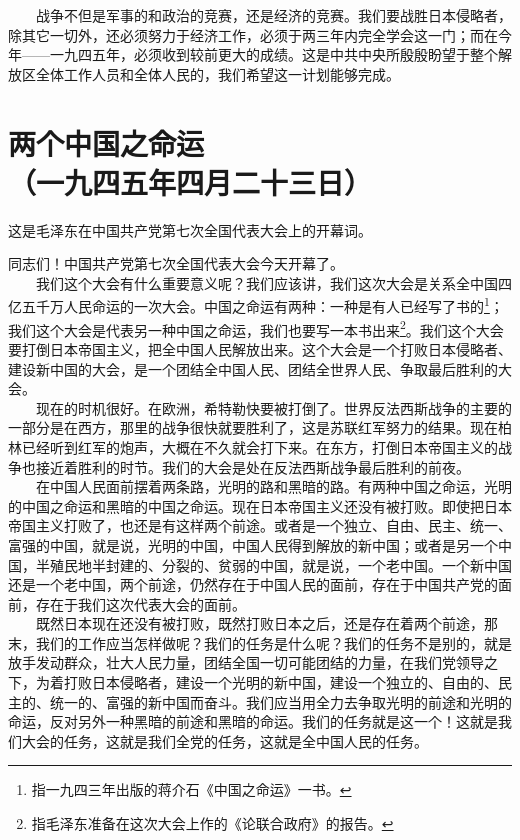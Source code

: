 \documentclass[cn,11pt,chinese]{elegantbook}
\def\myformat#1{\hfil\hfil #1}
\begin{document}
　　战争不但是军事的和政治的竞赛，还是经济的竞赛。我们要战胜日本侵略者，除其它一切外，还必须努力于经济工作，必须于两三年内完全学会这一门；而在今年——一九四五年，必须收到较前更大的成绩。这是中共中央所殷殷盼望于整个解放区全体工作人员和全体人民的，我们希望这一计划能够完成。\\
\newpage\section*{\myformat{两个中国之命运}\\\myformat{（一九四五年四月二十三日）}}
\begin{introduction}\item  这是毛泽东在中国共产党第七次全国代表大会上的开幕词。\end{introduction}
同志们！中国共产党第七次全国代表大会今天开幕了。\\
　　我们这个大会有什么重要意义呢？我们应该讲，我们这次大会是关系全中国四亿五千万人民命运的一次大会。中国之命运有两种：一种是有人已经写了书的\footnote[1]{ 指一九四三年出版的蒋介石《中国之命运》一书。}；我们这个大会是代表另一种中国之命运，我们也要写一本书出来\footnote[2]{ 指毛泽东准备在这次大会上作的《论联合政府》的报告。}。我们这个大会要打倒日本帝国主义，把全中国人民解放出来。这个大会是一个打败日本侵略者、建设新中国的大会，是一个团结全中国人民、团结全世界人民、争取最后胜利的大会。\\
　　现在的时机很好。在欧洲，希特勒快要被打倒了。世界反法西斯战争的主要的一部分是在西方，那里的战争很快就要胜利了，这是苏联红军努力的结果。现在柏林已经听到红军的炮声，大概在不久就会打下来。在东方，打倒日本帝国主义的战争也接近着胜利的时节。我们的大会是处在反法西斯战争最后胜利的前夜。\\
　　在中国人民面前摆着两条路，光明的路和黑暗的路。有两种中国之命运，光明的中国之命运和黑暗的中国之命运。现在日本帝国主义还没有被打败。即使把日本帝国主义打败了，也还是有这样两个前途。或者是一个独立、自由、民主、统一、富强的中国，就是说，光明的中国，中国人民得到解放的新中国；或者是另一个中国，半殖民地半封建的、分裂的、贫弱的中国，就是说，一个老中国。一个新中国还是一个老中国，两个前途，仍然存在于中国人民的面前，存在于中国共产党的面前，存在于我们这次代表大会的面前。\\
　　既然日本现在还没有被打败，既然打败日本之后，还是存在着两个前途，那末，我们的工作应当怎样做呢？我们的任务是什么呢？我们的任务不是别的，就是放手发动群众，壮大人民力量，团结全国一切可能团结的力量，在我们党领导之下，为着打败日本侵略者，建设一个光明的新中国，建设一个独立的、自由的、民主的、统一的、富强的新中国而奋斗。我们应当用全力去争取光明的前途和光明的命运，反对另外一种黑暗的前途和黑暗的命运。我们的任务就是这一个！这就是我们大会的任务，这就是我们全党的任务，这就是全中国人民的任务。\\
\end{document}
